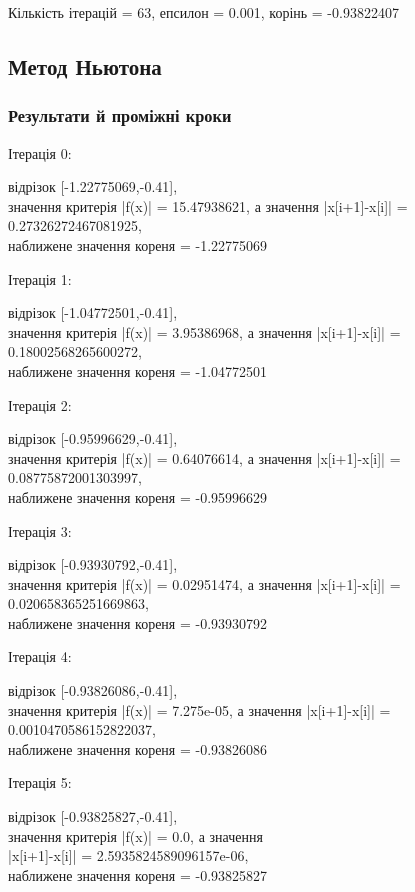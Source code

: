\documentclass[a4paper,14pt]{extarticle} %
\begin{document}
Кількість ітерацій = 63, епсилон = 0.001, корінь = -0.93822407

\newpage
\subsection{Метод Ньютона}



\subsubsection*{Результати й проміжні кроки}

Ітерація 0: \parbox[t]{12cm}{ відрізок [-1.22775069,-0.41], \\
            значення критерія |f(x)| = 15.47938621, а значення |x[i+1]-x[i]| = 0.27326272467081925, \\
            наближене значення кореня = -1.22775069 \\ } \par
Ітерація 1: \parbox[t]{12cm}{ відрізок [-1.04772501,-0.41], \\
            значення критерія |f(x)| = 3.95386968, а значення |x[i+1]-x[i]| = 0.18002568265600272, \\
            наближене значення кореня = -1.04772501 \\ } \par
Ітерація 2: \parbox[t]{12cm}{ відрізок [-0.95996629,-0.41], \\
            значення критерія |f(x)| = 0.64076614, а значення |x[i+1]-x[i]| = 0.08775872001303997, \\
            наближене значення кореня = -0.95996629 \\ } \par
Ітерація 3: \parbox[t]{12cm}{ відрізок [-0.93930792,-0.41], \\
            значення критерія |f(x)| = 0.02951474, а значення |x[i+1]-x[i]| = 0.020658365251669863, \\
            наближене значення кореня = -0.93930792 \\ } \par
Ітерація 4: \parbox[t]{12cm}{ відрізок [-0.93826086,-0.41], \\
            значення критерія |f(x)| = 7.275e-05, а значення |x[i+1]-x[i]| = 0.0010470586152822037, \\
            наближене значення кореня = -0.93826086 \\ } \par
Ітерація 5: \parbox[t]{12cm}{ відрізок [-0.93825827,-0.41], \\
            значення критерія |f(x)| = 0.0, а значення \\ |x[i+1]-x[i]| = 2.5935824589096157e-06, \\
            наближене значення кореня = -0.93825827 \\ } \par
\end{document}
